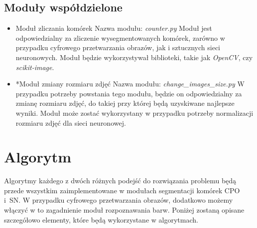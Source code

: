 \documentclass[a4paper]{article}
\begin{document}
\subsection{Moduły współdzielone}
\begin{itemize}
    \item Moduł zliczania komórek
    \newline
    Nazwa modułu: \textit{counter.py}
    \newline
    Moduł jest odpowiedzialny za zliczenie wysegmentowanych komórek, zarówno w przypadku cyfrowego przetwarzania obrazów, jak i sztucznych sieci neuronowych. Moduł będzie wykorzystywał biblioteki, takie jak \textit{OpenCV}, czy \textit{scikit-image}.
    \item *Moduł zmiany rozmiaru zdjęć
    \newline
    Nazwa modułu: \textit{change\_images\_size.py}
    \newline
    W przypadku potrzeby powstania tego modułu, będzie on odpowiedzialny za zmianę rozmiaru zdjęć, do takiej przy której będą uzyskiwane najlepsze wyniki. Moduł może zostać wykorzystany w przypadku potrzeby normalizacji rozmiaru zdjęć dla sieci neuronowej.
\end{itemize}


\section{Algorytm}
Algorytmy każdego z dwóch różnych podejść do rozwiązania problemu będą przede wszystkim zaimplementowane w modułach segmentacji komórek CPO i~SN. W przypadku cyfrowego przetwarzania obrazów, dodatkowo możemy włączyć w to zagadnienie moduł rozpoznawania barw. Poniżej zostaną opisane szczegółowo elementy, które będą wykorzystane w algorytmach.
\end{document}
